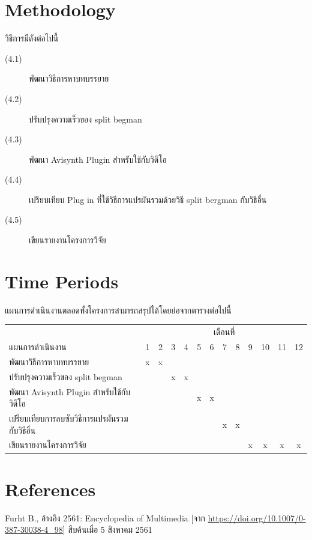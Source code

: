 \documentclass[hidelinks,a4paper,14pt]{article}
\numberwithin{equation}{section}							%
\begin{document}
{\section{Methodology}
วิธีการมีดังต่อไปนี้
\begin{description}
	\item[(4.1)] พัฒนาวิธีการหาบทบรรยาย
	\item[(4.2)] ปรับปรุงความเร็วของ split begman
	\item[(4.3)] พัฒนา Avisynth Plugin สำหรับใช้กับวิดีโอ
	\item[(4.4)] เปรียบเทียบ Plug in ที่ใช้วิธีการแปรผันรวมด้วยวิธี split bergman กับวิธีอื่น
	\item[(4.5)] เขียนรายงานโครงการวิจัย
\end{description}
\section{Time Periods}
แผนการดำเนินงานตลอดทั้งโครงการสามารถสรุปได้โดยย่อจากตารางต่อไปนี้
\begin{center}
	\begin{tabular}[ht]{|l|c|c|c|c|c|c|c|c|c|c|c|c|}
		\hline
		&\multicolumn{12}{c|}{เดือนที่}\\
		\cline{2-13}
		แผนการดำเนินงาน&1&2&3&4&5&6&7&8&9&10&11&12\\
		\hline
		พัฒนาวิธีการหาบทบรรยาย&x&x& & & & & & & & & &\\
		ปรับปรุงความเร็วของ split begman& & &x&x& & & & & & & &\\
		พัฒนา Avisynth Plugin สำหรับใช้กับวิดีโอ& & & & &x&x& & & & & &\\
		เปรียบเทียบการลบซับวิธีการแปรผันรวมกับวิธีอื่น & & & & & & &x&x& & & &\\
		เขียนรายงานโครงการวิจัย& & & & & & & & &x&x&x&x\\
		\hline
	\end{tabular}
\end{center}




\section{References}

\renewcommand{\section}[2]{} %
\begin{thebibliography}{}
	Furht B., อ้างอิง 2561: Encyclopedia of Multimedia [จาก \url{https://doi.org/10.1007/0-387-30038-4_98}] สืบค้นเมื่อ 5 สิงหาคม 2561
	

\end{thebibliography}}
\end{document}
